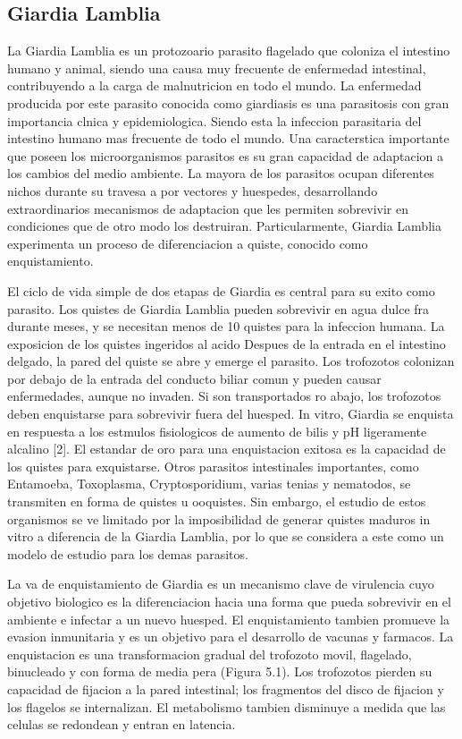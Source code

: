   \subsection{Giardia Lamblia}
    La Giardia Lamblia es un protozoario parasito flagelado que coloniza el intestino humano
    y animal, siendo una causa muy frecuente de enfermedad intestinal, contribuyendo a la carga
    de malnutricion en todo el mundo. La enfermedad producida por este parasito conocida
    como giardiasis es una parasitosis con gran importancia clnica y epidemiologica. Siendo esta
    la infeccion parasitaria del intestino humano mas frecuente de todo el mundo.
    Una caracterstica importante que poseen los microorganismos parasitos es su gran capacidad de
    adaptacion a los cambios del medio ambiente. La mayora de los parasitos ocupan
    diferentes nichos durante su travesa a por vectores y huespedes, desarrollando extraordinarios
    mecanismos de adaptacion que les permiten sobrevivir en condiciones que de otro modo
    los destruiran. Particularmente, Giardia Lamblia experimenta un proceso de diferenciacion
    a quiste, conocido como enquistamiento.

    El ciclo de vida simple de dos etapas de Giardia es central para su exito como parasito. Los
    quistes de Giardia Lamblia pueden sobrevivir en agua dulce fra durante meses, y se necesitan
    menos de 10 quistes para la infeccion humana. La exposicion de los quistes ingeridos al acido
    Despues de la entrada en el intestino delgado, la pared del quiste se abre y emerge el
    parasito. Los trofozotos colonizan por debajo de la entrada del conducto biliar comun y pueden
    causar enfermedades, aunque no invaden. Si son transportados ro abajo, los trofozotos
    deben enquistarse para sobrevivir fuera del huesped. In vitro, Giardia se enquista en respuesta a
    los estmulos fisiologicos de aumento de bilis y pH ligeramente alcalino [2]. El estandar
    de oro para una enquistacion exitosa es la capacidad de los quistes para exquistarse.
    Otros parasitos intestinales importantes, como Entamoeba, Toxoplasma, Cryptosporidium, varias
    tenias y nematodos, se transmiten en forma de quistes u ooquistes. Sin embargo,
    el estudio de estos organismos se ve limitado por la imposibilidad de generar quistes maduros
    in vitro a diferencia de la Giardia Lamblia, por lo que se considera a este como un modelo
    de estudio para los demas parasitos.

    La va de enquistamiento de Giardia es un mecanismo clave de virulencia cuyo objetivo
    biologico es la diferenciacion hacia una forma que pueda sobrevivir en el ambiente e infectar
    a un nuevo huesped. El enquistamiento tambien promueve la evasion inmunitaria y es un
    objetivo para el desarrollo de vacunas y farmacos.
    La enquistacion es una transformacion gradual del trofozoto movil, flagelado, binucleado
    y con forma de media pera (Figura 5.1). Los trofozotos pierden su capacidad de fijacion
    a la pared intestinal; los fragmentos del disco de fijacion y los flagelos se internalizan. El
    metabolismo tambien disminuye a medida que las celulas se redondean y entran en latencia.

